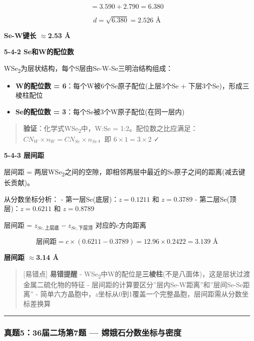 \documentclass[a4paper,11pt]{ctexart}
\providecommand{\tightlist}{\setlength{\itemsep}{0pt}\setlength{\parskip}{0pt}}
\newcommand{\箭}{\ensuremath{\rightarrow}}
\newcommand{\左箭}{\ensuremath{\leftarrow}}
\newcommand{\上箭}{\ensuremath{\uparrow}}
\newcommand{\下箭}{\ensuremath{\downarrow}}
\newcommand{\衡}{\ensuremath{\rightleftharpoons}}
\newcommand{\双箭}{\ensuremath{\leftrightarrow}}
\newcommand{\约等于}{\ensuremath{\approx}}
\newcommand{\小于等于}{\ensuremath{\leq}}
\newcommand{\大于等于}{\ensuremath{\geq}}
\newcommand{\不等于}{\ensuremath{\neq}}
\newcommand{\西格马}{\ensuremath{\sigma}}
\newcommand{\派}{\ensuremath{\pi}}
\begin{document}
\[= 3.590 + 2.790 = 6.380\]

\[d = \sqrt{6.380} = 2.526 \text{ Å}\]

\textbf{Se-W键长 \约等于 2.53 Å}

\textbf{5-4-2 Se和W的配位数}

WSe\textsubscript{2}为层状结构，每个S层由Se-W-Se三明治结构组成：

\begin{itemize}
\tightlist
\item
  \textbf{W的配位数 = 6}：每个W被6个Se原子配位(上层3个Se + 下层3个Se)，形成三棱柱配位
\item
  \textbf{Se的配位数 = 3}：每个Se被3个W原子配位(在同一层内)
\end{itemize}

\begin{quote}
\textbf{验证}：化学式WSe\textsubscript{2}中，W:Se = 1:2。配位数之比应满足：\(CN_W \times n_W = CN_{Se} \times n_{Se}\)，即 \(6 \times 1 = 3 \times 2\) ✓
\end{quote}

\textbf{5-4-3 层间距}

层间距 = 两层WSe\textsubscript{2}之间的空隙，即相邻两层中最近的Se原子之间的距离(减去键长贡献)。

从分数坐标分析：
- 第一层Se(底层)：\(z = 0.1211\) 和 \(z = 0.3789\)
- 第二层Se(顶层)：\(z = 0.6211\) 和 \(z = 0.8789\)

层间距 = \(z_{Se,上层底} - z_{Se,下层顶}\) 对应的\(c\)方向距离

\[\text{层间距} = c \times (0.6211 - 0.3789) = 12.96 \times 0.2422 = 3.139 \text{ Å}\]

\textbf{层间距 \约等于 3.14 Å}

\begin{quote}
{[}易错点{]} \textbf{易错提醒}
- WSe\textsubscript{2}中W的配位是\textbf{三棱柱}(不是八面体)，这是层状过渡金属二硫化物的特征
- 层间距的计算要区分''层内Se-W距离''和''层间Se-Se距离''
- 简单六方晶胞中，\(z\)坐标从0到1覆盖一个完整晶胞，层间距需从分数坐标差换算
\end{quote}

\begin{center}\rule{0.5\linewidth}{0.5pt}\end{center}

\subsubsection{真题5：36届二场第7题 --- 嫦娥石分数坐标与密度}\label{ux771fux9898536ux5c4aux4e8cux573aux7b2c7ux9898-ux5ae6ux5a25ux77f3ux5206ux6570ux5750ux6807ux4e0eux5bc6ux5ea6}
\end{document}
